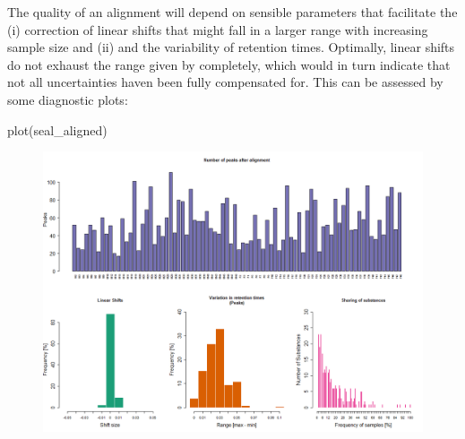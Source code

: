 The quality of an alignment will depend on sensible parameters that facilitate the (i) correction of linear shifts that might fall in a larger range with increasing sample size and (ii) and the variability of retention times. Optimally, linear shifts do not exhaust the range given by  completely, which would in turn indicate that not all uncertainties haven been fully compensated for. This can be assessed by some diagnostic plots:
\begin{example}
plot(seal_aligned)
\end{example}

\begin{figure}[htbp]
  \centering
  \includegraphics[width=13cm]{figures/plot-seal-aligned}
  \label{figure:plot_seal_aligned}
\end{figure} 





\address{Meinolf Ottensmann\\
  Department of Animal Behaviour\\
  Bielefeld University\\
   Morgenbreede 45\\
   33615 Bielefeld\\
  Germany\\}

\address{Martin A. Stoffel\\
   Department of Animal Behaviour\\
  Bielefeld University\\
   Morgenbreede 45\\
   33615 Bielefeld\\
  Germany\\}

\address{Joseph I. Hoffman\\
  Department of Animal Behaviour\\
  Bielefeld University\\
   Morgenbreede 45\\
   33615 Bielefeld\\
  Germany\\}
